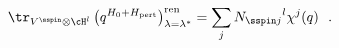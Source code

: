 \begin{equation} \label{charpert}  
  \tr_{V^{\sspin } \otimes \cH^{l}}\left( q^{H_0 + 
  H_{\rm pert}}\right)_{\lambda = \lambda^*}^{\rm ren} 
  = \sum_j {N_{\sspin  j}}^{l} \chi^{j}(q)\ \ .  
\end{equation} 
